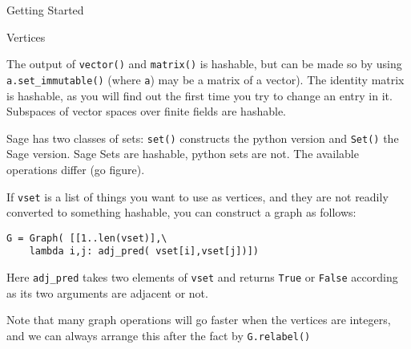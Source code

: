 \begin{chap}{Getting Started}
\begin{sect}{Vertices}
\begin{para}
The output of \verb|vector()| and \verb|matrix()| is hashable, but can
be made so by using \verb|a.set_immutable()| (where \verb|a|) may be a matrix
of a vector). The identity matrix is hashable, as you will find out the first 
time you try to change an entry in it. Subspaces of vector
spaces over finite fields are hashable.
\end{para}
%
\begin{para}
Sage has two classes of sets: \verb|set()| constructs the python version and
\verb|Set()| the Sage version. Sage Sets are hashable, python sets are not.
The available operations differ (go figure).
\end{para}
%
\begin{para}
If \verb|vset| is a list of things you want to use as vertices, and they are not 
readily converted to something hashable, you can construct a graph as follows:
\end{para}
%
\begin{verbatim}
G = Graph( [[1..len(vset)],\
    lambda i,j: adj_pred( vset[i],vset[j])])
\end{verbatim}
%
\begin{para}
Here \verb|adj_pred| takes two elements of \verb|vset| and returns
\verb|True| or \verb|False| according as its two arguments are adjacent or not.
\end{para}
%
\begin{para}
Note that many graph operations will go faster when the vertices are integers,
and we can always arrange this after the fact by \verb|G.relabel()|
\end{para}
%
\end{sect}
%
\end{chap}

